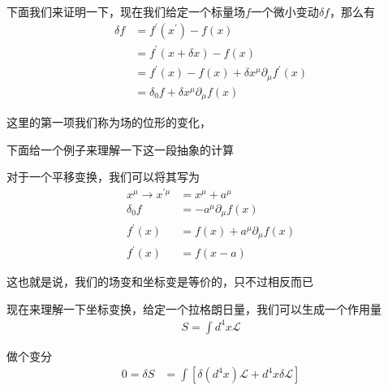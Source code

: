 下面我们来证明一下，现在我们给定一个标量场$f$一个微小变动$\delta f$，那么有
\begin{align*}
    \delta f&=f^\prime(x^\prime)-f(x)\\
    &=f^\prime(x+\delta x)-f(x)\\
    &=f^\prime(x)-f(x)+\delta x^\mu\partial_\mu f^\prime(x)\\
    &=\delta_0 f+\delta x^\mu\partial_\mu f(x)
\end{align*}

这里的第一项我们称为场的位形的变化，

下面给一个例子来理解一下这一段抽象的计算
\begin{example}
    对于一个平移变换，我们可以将其写为
    \begin{align*}
        x^\mu\to x^{\prime\mu}&=x^\mu+a^\mu\\
        \delta_0 f&=-a^\mu\partial_\mu f(x)\\
        f^\prime(x)&=f(x)+a^\mu\partial_\mu f(x)\\
        f^\prime(x)&=f(x-a)
    \end{align*}

    这也就是说，我们的场变和坐标变是等价的，只不过相反而已
\end{example}

现在来理解一下坐标变换，给定一个拉格朗日量，我们可以生成一个作用量
\begin{align*}
    S=\int d^4x\mathcal{L}
\end{align*}

做个变分
\begin{align*}
    0=\delta S&=\int \left[\delta\left(
    d^4x\right)\mathcal{L}+d^4x\delta\mathcal{L}\right]
\end{align*}

